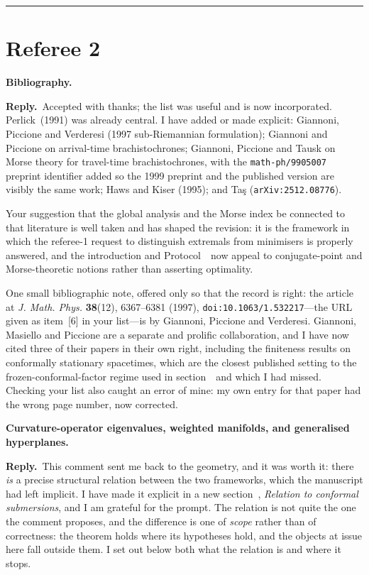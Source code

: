 \documentclass[11pt]{article}
\newcommand{\reply}{\par\noindent\textbf{Reply.}\ }
\newcommand{\R}[1]{\par\medskip\noindent\textbf{#1}\par\nopagebreak}
\begin{document}
\bigskip
\hrule
\section*{Referee 2}

\R{Bibliography.}

\reply Accepted with thanks; the list was useful and is now incorporated.
Perlick~(1991) was already central. I have added or made explicit: Giannoni,
Piccione and Verderesi (1997 sub-Riemannian formulation); Giannoni and Piccione
on arrival-time brachistochrones; Giannoni, Piccione and Tausk on Morse theory
for travel-time brachistochrones, with the \texttt{math-ph/9905007} preprint
identifier added so the 1999 preprint and the published version are visibly the
same work; Haws and Kiser (1995); and Ta\c{s} (\texttt{arXiv:2512.08776}).

Your suggestion that the global analysis and the Morse index be connected to that
literature is well taken and has shaped the revision: it is the framework in
which the referee-1 request to distinguish extremals from minimisers is properly
answered, and the introduction and Protocol~\msProtStatus\ now appeal to conjugate-point
and Morse-theoretic notions rather than asserting optimality.

One small bibliographic note, offered only so that the record is right: the
article at \emph{J. Math. Phys.} \textbf{38}(12), 6367--6381 (1997),
\texttt{doi:10.1063/1.532217}---the URL given as item~[6] in your list---is by
Giannoni, Piccione and Verderesi. Giannoni, Masiello and Piccione are a separate
and prolific collaboration, and I have now cited three of their papers in their
own right, including the finiteness results on conformally stationary spacetimes,
which are the closest published setting to the frozen-conformal-factor regime
used in section~\msSecClassification\ and which I had missed. Checking your list also caught an error
of mine: my own entry for that paper had the wrong page number, now corrected.

\R{Curvature-operator eigenvalues, weighted manifolds, and generalised
hyperplanes.}

\reply This comment sent me back to the geometry, and it was worth it: there
\emph{is} a precise structural relation between the two frameworks, which the
manuscript had left implicit. I have made it explicit in a new
section~\msSecSubmersion, \emph{Relation to conformal submersions}, and I am
grateful for the prompt. The relation is not quite the one the comment
proposes, and the difference is one of \emph{scope} rather than of correctness: the
theorem holds where its hypotheses hold, and the objects at issue here fall outside
them. I set out below both what the relation is and where it stops.
\end{document}
